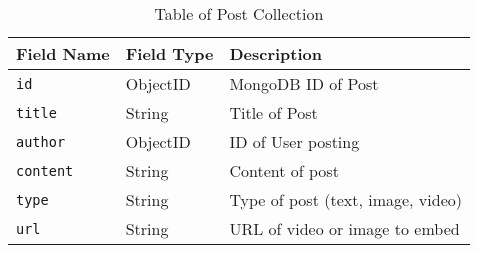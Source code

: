 \documentclass{homework}
\begin{document}
\begin{table}[H]
    \centering
    \begin{tabular}{lll}
        \hline
        Field Name  & Field Type & Description                         \\ \hline
        \texttt{id}      & ObjectID & MongoDB ID of Post                \\
        \texttt{title}   & String   & Title of Post                     \\
        \texttt{author}  & ObjectID & ID of User posting                \\
        \texttt{content} & String   & Content of post                   \\
        \texttt{type}    & String   & Type of post (text, image, video) \\
        \texttt{url}     & String   & URL of video or image to embed    \\
        \hline
    \end{tabular}
    \caption{Table of Post Collection}
\end{table}
\end{document}
